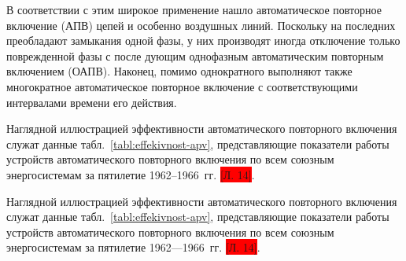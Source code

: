 В соответствии с этим широкое применение нашло автоматическое повторное включение (АПВ) цепей и особенно воздушных линий. Поскольку на последних преобладают замыкания одной фазы, у них производят иногда отключение только поврежденной фазы с после дующим однофазным автоматическим повторным включением (ОАПВ). Наконец, помимо однократного выполняют также многократное автоматическое повторное включение с соответствующими интервалами времени его действия.

Наглядной иллюстрацией эффективности автоматического повторного включения служат данные табл.~\ref{tabl:effekivnost-apv}, представляющие показатели работы устройств автоматического повторного включения по всем союзным энергосистемам за пятилетие 1962--1966~гг. \colorbox{red}{[Л. 14]}.



\parbox{5em}{Наглядной иллюстрацией эффективности автоматического повторного включения служат данные табл.~\ref{tabl:effekivnost-apv}, представляющие показатели работы устройств автоматического повторного включения по всем союзным энергосистемам за пятилетие 1962—1966~гг. \colorbox{red}{[Л. 14]}.}

